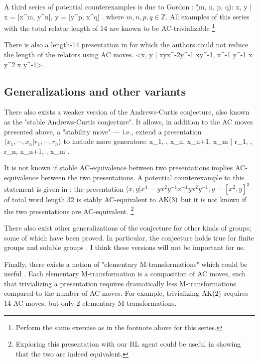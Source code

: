 A third series of potential counterexamples is due to Gordon \cite{Brown}:
\bea
\G(m, n, p, q): \langle x, y | x = [x^m, y^n], y = [y^p, x^q] \rangle.
\eea
where $m,n,p,q \in \mathbb{Z}$. All examples of this series with the total relator length of 14 are known
to be AC-trivializable \cite{Bowman-McCaul}
\footnote{Perform the same exercise as in the footnote above for this series.}
\newline

There is also a length-14 presentation in \cite{MMS} for which the authors could not reduce the length of the relators using AC moves.
\bea
<x, y | xyx^{-2}y^{-1} xy^{-1}, x^{-1} y^{-1} x y^2 x y^{-1}>.
\eea

\subsection{Generalizations and other variants}

There also exists a weaker version of the Andrews-Curtis conjecture, also known as the "stable Andrews-Curtis conjecture". It allows, in addition to the AC moves presented above, a "stability move" --- i.e., extend a presentation $\langle x_1, \cdots, x_n | r_1, \cdots, r_n \rangle$ to include more generators:
\bea
\langle x_1, \cdots, x_n, x_{n+1}, \cdots x_m | r_1, \cdots, r_n, x_{n+1}, \cdots, x_m \rangle.
\eea

It is not known if stable AC-equivalence between two presentations implies AC-equivalence between the two presentations. A potential counterexample to this statement is given in \cite{MMS}: the presentation $\langle x, y | x^4 = y x^2 y^{-1} x^{-1} y x^2 y^{-1}, y = [x^2, y]^3 $ of total word length 32 is stably AC-equivalent to $\text{AK}(3)$ but it is not known if the two presentations are AC-equivalent.
\footnote{Exploring this presentation with our RL agent could be useful in showing that the two are indeed equivalent.}
\newline

There also exist other generalizations of the conjecture for other kinds of groups; some of which have been proved. In particular, the conjecture holds true for finite groups and soluble groups \cite{Borovik, Guyot}. I think these versions will not be important for us.
\newline

Finally, there exists a notion of "elementary M-transformations" which could be useful \cite{BurnsI, BurnsII}. Each elementary M-transformation is a composition of AC moves, such that trivializing a presentation requires dramatically less M-transformations compared to the number of AC moves. For example, trivializing $\text{AK}(2)$ requires 14 AC moves, but only 2 elementary M-transformations.